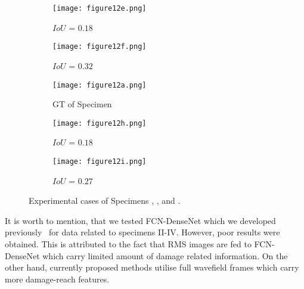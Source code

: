 \begin{figure} [!h]
	\hfill
	\begin{subfigure}[b]{0.32\textwidth}
		\centering
		\texttt{[image: figure12e.png]}
		\caption{\(IoU\) = \(0.18\)} 
		\label{fig:L3_S3_B_saeed}
	\end{subfigure}
	\hfill
	\begin{subfigure}[b]{0.32\textwidth}
		\centering
		\texttt{[image: figure12f.png]}
		\caption{\(IoU\) = \(0.32\)} 
		\label{fig:L3_S3_B_ijjeh}
	\end{subfigure}
	\par\medskip
	\begin{subfigure}[b]{0.32\textwidth}
		\centering
		\texttt{[image: figure12a.png]}
		\caption{GT of Specimen~}
		\label{fig:gt_specimen_4}
	\end{subfigure}
	\hfill
	\begin{subfigure}[b]{0.32\textwidth}
		\centering
		\texttt{[image: figure12h.png]}
		\caption{\(IoU\) = \(0.18\)}  
		\label{fig:L3_S4_B_saeed}
	\end{subfigure}
	\hfill
	\begin{subfigure}[b]{0.32\textwidth}
		\centering
		\texttt{[image: figure12i.png]}
		\caption{\(IoU\) = \(0.27\)} 
		\label{fig:L3_S4_B_ijjeh}
	\end{subfigure}
	\caption{Experimental cases of Specimens , , and .}
	\label{fig:exp_case}
\end{figure} 

It is worth to mention, that we tested FCN-DenseNet which we developed previously~\cite{Ijjeh2021} for data related to specimens II-IV. 
However, poor results were obtained. 
This is attributed to the fact that RMS images are fed to FCN-DenseNet which carry limited amount of damage related information. 
On the other hand, currently proposed methods utilise full wavefield frames which carry more damage-reach features. 

